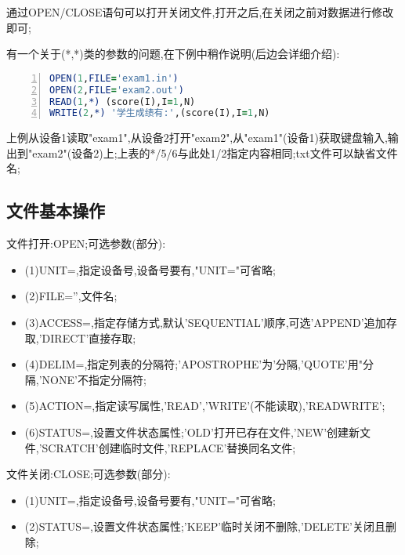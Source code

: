 \par

通过OPEN/CLOSE语句可以打开关闭文件,打开之后,在关闭之前对数据进行修改即可;\par

有一个关于(*,*)类的参数的问题,在下例中稍作说明(后边会详细介绍):

\begin{lstlisting}[numbers=left,frame=single,language=Fortran]
OPEN(1,FILE='exam1.in')
OPEN(2,FILE='exam2.out')
READ(1,*) (score(I),I=1,N)
WRITE(2,*) '学生成绩有:',(score(I),I=1,N)
\end{lstlisting}
\par

上例从设备1读取"exam1",从设备2打开"exam2",从"exam1"(设备1)获取键盘输入,输出到"exam2"(设备2)上;上表的*/5/6与此处1/2指定内容相同;txt文件可以缺省文件名;
 

\subsection{文件基本操作}
文件打开:OPEN;可选参数(部分):

\begin{itemize}
	\item{(1)UNIT=,指定设备号,设备号要有,"UNIT="可省略;}
	\item{(2)FILE='',文件名;}
	\item{(3)ACCESS=,指定存储方式,默认'SEQUENTIAL'顺序,可选'APPEND'追加存取,'DIRECT'直接存取;}
	\item{(4)DELIM=,指定列表的分隔符;'APOSTROPHE'为'分隔,'QUOTE'用"分隔,'NONE'不指定分隔符;}
	\item{(5)ACTION=,指定读写属性,'READ','WRITE'(不能读取),'READWRITE';}
	\item{(6)STATUS=,设置文件状态属性;'OLD'打开已存在文件,'NEW'创建新文件,'SCRATCH'创建临时文件,'REPLACE'替换同名文件;}
\end{itemize}
\par

文件关闭:CLOSE;可选参数(部分):

\begin{itemize}
	\item{(1)UNIT=,指定设备号,设备号要有,"UNIT="可省略;}
	\item{(2)STATUS=,设置文件状态属性;'KEEP'临时关闭不删除,'DELETE'关闭且删除;}
\end{itemize}
\par

